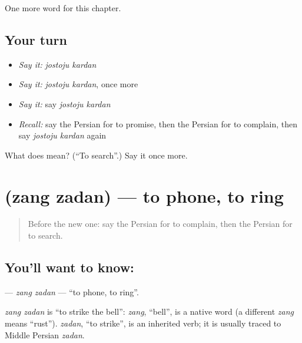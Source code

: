 \begin{grammarlens}[title={What you've built}]
One more word for this chapter.
\end{grammarlens}

\subsection*{Your turn}
\begin{itemize}
\raggedright
  \item \emph{Say it:} \emph{jostoju kardan}
  \item \emph{Say it:} \emph{jostoju kardan}, once more
  \item \emph{Say it:} say \emph{jostoju kardan}
  \item \emph{Recall:} say the Persian for to promise, then the Persian for to complain, then say \emph{jostoju kardan} again
\end{itemize}

\begin{tcolorbox}[breakable,colback=teal!4,colframe=teal!35!black,title={Before you move on}]
What does   mean? (\textquotedblleft{}To search\textquotedblright{}.) Say it once more.
\end{tcolorbox}
\section[\texorpdfstring{\fa{زنگ} \fa{زدن} (zang zadan)}{زنگ زدن (zang zadan)}]{  (zang zadan) — to phone, to ring}

\label{lesson:FA-C258-zang-zadan}



\begin{quote}
Before the new one: say the Persian for to complain, then the Persian for to search.
\end{quote}

\subsection*{You'll want to know:  }
\textbf{ } — \emph{zang zadan} — \textquotedblleft{}to phone, to ring\textquotedblright{}.

\begin{cousinweb}
\emph{zang zadan} is \textquotedblleft{}to strike the bell\textquotedblright{}: \emph{zang}, \textquotedblleft{}bell\textquotedblright{}, is a native word (a different \emph{zang} means \textquotedblleft{}rust\textquotedblright{}). \emph{zadan}, \textquotedblleft{}to strike\textquotedblright{}, is an inherited verb; it is usually traced to Middle Persian \emph{zadan}.
\end{cousinweb}

